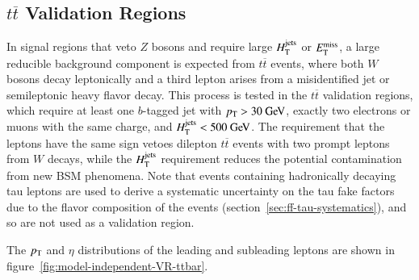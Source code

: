 \subsection{$t\overline{t}$ Validation Regions}\label{sec:model-independent-validation-regions-ttbar}
In signal regions that veto $Z$ bosons and require large $H_{\mathrm{T}}^{\mathrm{jets}}$ or $E_{\text{T}}^{\text{miss}}$, a large reducible background component is expected from $t\overline{t}$ events, where both $W$ bosons decay leptonically and a third lepton arises from a misidentified jet or semileptonic heavy flavor decay. This process is tested in the $t\overline{t}$ validation regions, which require at least one $b$-tagged jet with $\pt>30 \GeV$, exactly two electrons or muons with the same charge, and $\Ht<500 \GeV$. The requirement that the leptons have the same sign vetoes dilepton $t\overline{t}$ events with two prompt leptons from $W$ decays, while the $H_{\mathrm{T}}^{\mathrm{jets}}$ requirement reduces the potential contamination from new BSM phenomena. Note that events containing hadronically decaying tau leptons are used to derive a systematic uncertainty on the tau fake factors due to the flavor composition of the events (section~\ref{sec:ff-tau-systematics}), and so are not used as a validation region. 

The $p_{\text{T}}$ and $\eta$ distributions of the leading and subleading leptons are shown in figure~\ref{fig:model-independent-VR-ttbar}.

